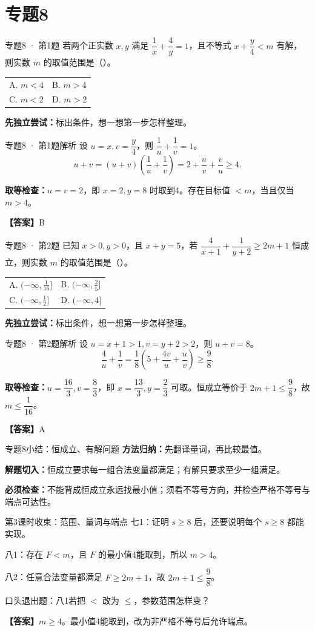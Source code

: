 \documentclass[UTF8,10pt,aspectratio=169]{ctexbeamer}
\makeatletter
\newcommand{\Answer}[1]{\par\vspace{0.2cm}\textbf{【答案】}#1}
\newcommand{\Choices}[4]{\par\vspace{0.2cm}\begin{tabular}{@{}p{0.47\textwidth}p{0.47\textwidth}@{}}A. #1 & B. #2 \\[0.15cm] C. #3 & D. #4\end{tabular}}
\makeatother
\begin{document}
\section{专题8}
\begin{frame}[t]{专题8 · 第1题}
若两个正实数 $x,y$ 满足 $\dfrac1x+\dfrac4y=1$，且不等式 $x+\dfrac y4<m$ 有解，则实数 $m$ 的取值范围是（\quad）。
\Choices{$m<4$}{$m>4$}{$m<2$}{$m>2$}
\par\vspace{0.3cm}\textbf{先独立尝试：}标出条件，想一想第一步怎样整理。
\end{frame}
\begin{frame}[t]{专题8 · 第1题解析}
设 $u=x,v=\dfrac{y}{4}$，则 $\dfrac{1}{u}+\dfrac{1}{v}=1$。\[u+v=(u+v)\left(\frac1u+\frac1v\right)=2+\frac uv+\frac vu\ge4.\]
\pause
\par\vspace{0.2cm}\textbf{取等检查：}$u=v=2$，即 $x=2,y=8$ 时取到4。存在目标值 $<m$，当且仅当 $m>4$。
\Answer{B}
\end{frame}
\begin{frame}[t]{专题8 · 第2题}
已知 $x>0,y>0$，且 $x+y=5$，若 $\dfrac4{x+1}+\dfrac1{y+2}\ge2m+1$ 恒成立，则实数 $m$ 的取值范围是（\quad）。
\Choices{$(-\infty,\frac1{16}]$}{$(-\infty,\frac25]$}{$(-\infty,\frac12]$}{$(-\infty,4]$}
\par\vspace{0.3cm}\textbf{先独立尝试：}标出条件，想一想第一步怎样整理。
\end{frame}
\begin{frame}[t]{专题8 · 第2题解析}
设 $u=x+1>1,v=y+2>2$，则 $u+v=8$。\[\frac4u+\frac1v=\frac18\left(5+\frac{4v}u+\frac uv\right)\ge\frac98.\]
\pause
\par\vspace{0.2cm}\textbf{取等检查：}$u=\dfrac{16}{3},v=\dfrac{8}{3}$，即 $x=\dfrac{13}{3},y=\dfrac{2}{3}$ 可取。恒成立等价于 $2m+1\le\dfrac{9}{8}$，故 $m\le\dfrac{1}{16}$。
\Answer{A}
\end{frame}
\begin{frame}[t]{专题8小结：恒成立、有解问题}
\textbf{方法归纳：}先翻译量词，再比较最值。\par\vspace{0.4cm}
\textbf{解题切入：}恒成立要求每一组合法变量都满足；有解只要求至少一组满足。\par\vspace{0.4cm}
\textbf{必须检查：}不能背成恒成立永远找最小值；须看不等号方向，并检查严格不等号与端点可达性。
\end{frame}
\begin{frame}[t]{第3课时收束：范围、量词与端点}
七1：证明 $s\ge8$ 后，还要说明每个 $s\ge8$ 都能实现。\par\vspace{0.3cm}
八1：存在 $F<m$，且 $F$ 的最小值4能取到，所以 $m>4$。\par\vspace{0.3cm}
八2：任意合法变量都满足 $F\ge2m+1$，故 $2m+1\le\dfrac{9}{8}$。\par\vspace{0.4cm}
口头退出题：八1若把 $<$ 改为 $\le$，参数范围怎样变？
\pause
\Answer{$m\ge4$。最小值4能取到，改为非严格不等号后允许端点。}
\end{frame}
\end{document}
